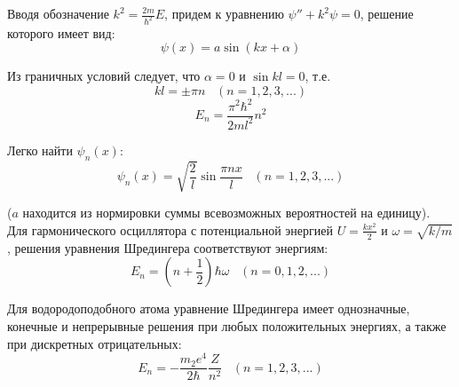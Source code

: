 \documentclass{article}
\begin{document}
	Вводя обозначение $k^2=\frac{2m}{\hbar^2}E$, придем к уравнению $\psi''+k^2\psi = 0$, решение которого имеет вид:
	\begin{equation}
		\psi(x) = a\sin(kx+\alpha)
	\end{equation}

	Из граничных условий следует, что $\alpha=0$ и $\sin kl=0$, т.е. 
	\begin{equation}
		kl=\pm\pi n\;\;\;(n=1,2,3,...)
	\end{equation}
	\begin{equation}
		E_n=\frac{\pi^2\hbar^2}{2ml^2}n^2
	\end{equation}

	Легко найти $\psi_n(x):$
	\begin{equation}
		\psi_n(x)=\sqrt{\frac{2}{l}}\sin\frac{\pi n x}{l}\;\;\;(n=1,2,3,...)
	\end{equation}

	($a$ находится из нормировки суммы всевозможных вероятностей на единицу).\\

	Для гармонического осциллятора с потенциальной энергией $U=\frac{kx^2}{2}$ и $\omega = \sqrt{k/m}$, решения уравнения Шредингера соответствуют энергиям:
	\begin{equation}
		E_n=(n+\frac{1}{2})\hbar\omega\;\;\;(n=0,1,2,...)
	\end{equation}

	Для водородоподобного атома уравнение Шредингера имеет однозначные, конечные и непрерывные решения при любых положительных энергиях, а также при дискретных отрицательных:
	\begin{equation}
		E_n = -\frac{m_2 e^4}{2\hbar}\frac{Z}{n^2}\;\;\;(n=1,2,3,...)
	\end{equation}

	
\end{document}
